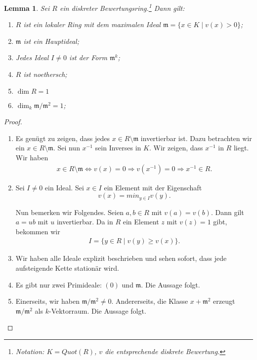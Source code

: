 \documentclass[reqno,12pt]{article}
\numberwithin{equation}{section}
\theoremstyle{plain}
\newtheorem{lemma}[thm]{Lemma}
\theoremstyle{definition}
\begin{document}
\begin{lemma}\label{lemma-properties-of-dvr}
Sei $R$ ein diskreter Bewertungsring.\footnote{Notation: $K=Quot(R)$, $v$ die entsprechende diskrete Bewertung.} Dann gilt:
\begin{enumerate}
\item $R$ ist ein lokaler Ring mit dem maximalen Ideal $\mathfrak{m} = \{x \in K \mid v(x) > 0 \}$;
\item $\mathfrak{m}$ ist ein Hauptideal;
\item Jedes Ideal $I \neq 0$ ist der Form $\mathfrak{m}^k$;
\item $R$ ist noethersch;
\item $\dim R = 1$
\item $\dim_k \mathfrak{m}/\mathfrak{m}^2 = 1$;
\end{enumerate}
\end{lemma}

\begin{proof}
\
\begin{enumerate}
\item Es genügt zu zeigen, dass jedes $x \in R \setminus \mathfrak{m}$ invertierbar ist. Dazu betrachten wir ein $x \in R \setminus \mathfrak{m}$. Sei nun $x^{-1}$ sein Inverses in $K$. Wir zeigen, dass $x^{-1}$ in $R$ liegt. Wir haben
\begin{align*}
x \in R \setminus \mathfrak{m} \iff v(x) = 0 \Rightarrow v(x^{-1}) = 0 \Rightarrow x^{-1} \in R.
\end{align*}

\item Sei $I \neq 0$ ein Ideal. Sei $x \in I$ ein Element mit der Eigenschaft
$$
v(x) = min_{y \in I} v(y).
$$

Nun bemerken wir Folgendes. Seien $a,b \in R$ mit $v(a)=v(b)$. Dann gilt $a = u b$ mit $u$ invertierbar. Da in $R$ ein Element $z$ mit $v(z)=1$ gibt, bekommen wir
\begin{align*}
I = \{ y \in R \mid v(y) \geq v(x) \}.
\end{align*}


\item Wir haben alle Ideale explizit beschrieben und sehen sofort, dass jede aufsteigende Kette stationär wird.

\item Es gibt nur zwei Primideale: $(0)$ und $\mathfrak{m}$. Die Aussage folgt.

\item Einerseits, wir haben $\mathfrak{m}/\mathfrak{m}^2 \neq 0$. Andererseits, die Klasse $x + \mathfrak{m}^2$ erzeugt $\mathfrak{m}/\mathfrak{m}^2$ als $k$-Vektorraum. Die Aussage folgt.
\end{enumerate}
\end{proof}
\end{document}
